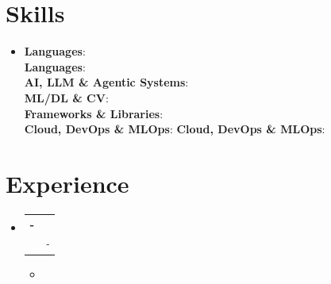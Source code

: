 \documentclass[a4paper,10pt]{article}
\makeatletter
\newcommand{\resumeSubheading}[4]{
  \vspace{-1pt}\item
    \begin{tabular*}{0.97\textwidth}[t]{l@{\extracolsep{\fill}}r}
      \textbf{#1} & #2 \\
      \textit{\small#3} & \textit{\small #4} \\
    \end{tabular*}\vspace{-5pt}
}
\newcommand{\resumeItem}[1]{\item\small{#1\vspace{-2pt}}}
\newcommand{\resumeSubHeadingListStart}{\begin{itemize}[leftmargin=0.15in, label={}, itemsep=0pt, parsep=0pt]}
\newcommand{\resumeSubHeadingListEnd}{\end{itemize}}
\newcommand{\resumeItemListStart}{\begin{itemize}[leftmargin=0.15in, itemsep=1pt, parsep=0pt]}
\newcommand{\resumeItemListEnd}{\end{itemize}\vspace{-4pt}}
\makeatother
\begin{document}
\section{Skills}
\begin{itemize}[leftmargin=0.15in, label={}, itemsep=1pt]
  \item \small{
    \textbf{Languages}{: } \\
    \textbf{Languages}{: } \\
    \textbf{AI, LLM \& Agentic Systems}{: } \\
    \textbf{ML/DL \& CV}{: } \\
    \textbf{Frameworks \& Libraries}{: } \\
    \textbf{Cloud, DevOps \& MLOps}{: }
    \textbf{Cloud, DevOps \& MLOps}{: }
  }
\end{itemize}

\section{Experience}
\resumeSubHeadingListStart
  \resumeSubheading
  {\BLOCK{ if job.technologies }\VAR{ job.company | escape_latex }\BLOCK{ else }\BLOCK{ if job.role and not (job.company and job.role in job.company) }\VAR{ job.company | escape_latex } - \VAR{ job.role | escape_latex }\BLOCK{ else }\VAR{ job.company | escape_latex }\BLOCK{ endif }\BLOCK{ endif }}{\VAR{ job.location | escape_latex }}
  {\BLOCK{ if job.technologies }\VAR{ job.technologies | escape_latex }\BLOCK{ else }\VAR{ job.role | escape_latex }\BLOCK{ endif }}{\BLOCK{ if job.startDate }\VAR{ job.startDate | escape_latex }\BLOCK{ endif }\BLOCK{ if job.startDate and job.endDate } - \BLOCK{ endif }\BLOCK{ if job.endDate }\VAR{ job.endDate | escape_latex }\BLOCK{ endif }}
  \resumeItemListStart
    \resumeItem{}
  \resumeItemListEnd
  \vspace{2pt}
\resumeSubHeadingListEnd
{}
\end{document}
